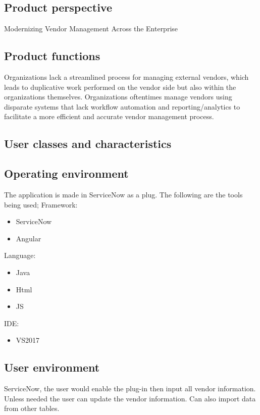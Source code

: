\documentclass[10pt]{article}
\begin{document}
\subsection{Product perspective}

Modernizing Vendor Management Across the Enterprise

\subsection{Product functions}

Organizations lack a streamlined process for managing external vendors, which leads to duplicative work performed on the vendor side but also within the organizations themselves. Organizations oftentimes manage vendors using disparate systems that lack workflow automation and reporting/analytics to facilitate a more efficient and accurate vendor management process.

\subsection{User classes and characteristics}

\lipsum[10]

\subsection{Operating environment}

The application is made in ServiceNow as a plug. The following are the tools being used;
Framework:
\begin{itemize}
	\item ServiceNow
	\item Angular
\end{itemize}
Language:
\begin{itemize}
	\item Java
	\item Html
	\item JS
\end{itemize}
IDE:
\begin{itemize}
	\item VS2017
\end{itemize}

\subsection{User environment}

ServiceNow, the user would enable the plug-in then input all vendor information. Unless needed the user can update the vendor information. Can also import data from other tables. 
\end{document}
